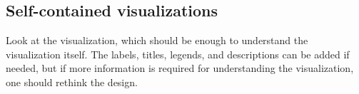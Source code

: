 \subsection{Self-contained visualizations}
Look at the visualization, which should be enough to understand the visualization itself. The labels, titles, legends, and descriptions can be added if needed, but if more information is required for understanding the visualization, one should rethink the design.